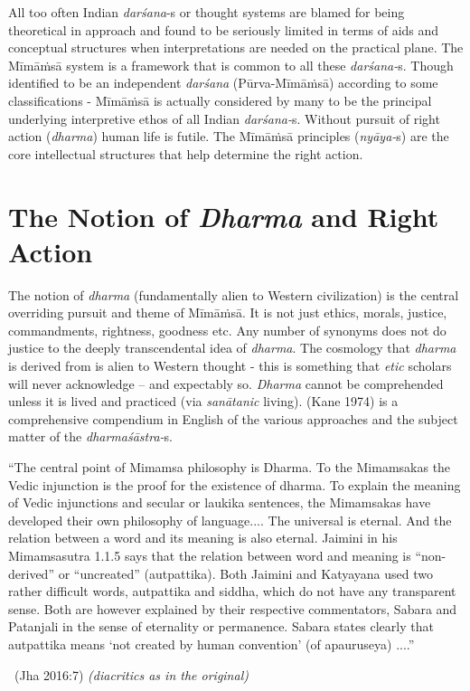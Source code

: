 All too often Indian \textit{darśana}-s or thought systems are blamed for being theoretical in approach and found to be seriously limited in terms of aids and conceptual structures when interpretations are needed on the practical plane. The Mīmāṁsā system is a framework that is common to all these \textit{darśana-}s. Though identified to be an independent \textit{darśana} (Pūrva-Mīmāṁsā) according to some classifications - Mīmāṁsā is actually considered by many to be the principal underlying interpretive ethos of all Indian \textit{darśana-}s. Without pursuit of right action (\textit{dharma}) human life is futile. The Mīmāṁsā principles (\textit{nyāya-}s) are the core intellectual structures that help determine the right action.


\section*{The Notion of \textit{Dharma} and Right Action}

The notion of \textit{dharma} (fundamentally alien to Western civilization) is the central overriding pursuit and theme of Mīmāṁsā. It is not just ethics, morals, justice, commandments, rightness, goodness etc. Any number of synonyms does not do justice to the deeply transcendental idea of \textit{dharma}. The cosmology that \textit{dharma} is derived from is alien to Western thought - this is something that \textit{etic} scholars will never acknowledge – and expectably so. \textit{Dharma} cannot be comprehended unless it is lived and practiced (via \textit{sanātanic} living). (Kane 1974) is a comprehensive compendium in English of the various approaches and the subject matter of the \textit{dharmaśāstra-}s.
\begin{myquote}
“The central point of Mimamsa philosophy is Dharma. To the Mimamsakas the Vedic injunction is the proof for the existence of dharma. To explain the meaning of Vedic injunctions and secular or laukika sentences, the Mimamsakas have developed their own philosophy of language.... The universal is eternal. And the relation between a word and its meaning is also eternal. Jaimini in his Mimamsasutra 1.1.5 says that the relation between word and meaning is “non-derived” or “uncreated” (autpattika). Both Jaimini and Katyayana used two rather difficult words, autpattika and siddha, which do not have any transparent sense. Both are however explained by their respective commentators, Sabara and Patanjali in the sense of eternality or permanence. Sabara states clearly that autpattika means ‘not created by human convention’ (of apauruseya) ....”

~\hfill (Jha 2016:7) \textit{(diacritics as in the original)}
\end{myquote}

